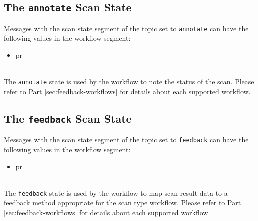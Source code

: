 \subsection{The \texttt{annotate} Scan State}

Messages with the scan state segment of the topic set to \texttt{annotate} can have the following
values in the workflow segment:

\begin{itemize}
    \item pr
\end{itemize}

\noindent\\The \texttt{annotate} state is used by the workflow to note the status of the
scan.  Please refer to Part \ref{sec:feedback-workflows} for details about each supported
workflow.


\subsection{The \texttt{feedback} Scan State}

Messages with the scan state segment of the topic set to \texttt{feedback} can have the following
values in the workflow segment:

\begin{itemize}
    \item pr
\end{itemize}

\noindent\\The \texttt{feedback} state is used by the workflow to map scan result data to
a feedback method appropriate for the scan type workflow.  
Please refer to Part \ref{sec:feedback-workflows} for details about each supported workflow.
